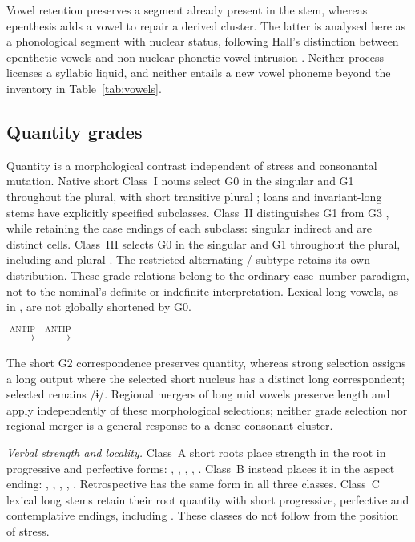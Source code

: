 Vowel retention preserves a segment already present in the stem, whereas
epenthesis adds a vowel to repair a derived cluster. The latter is analysed
here as a phonological segment with nuclear status, following Hall's distinction
between epenthetic vowels and non-nuclear phonetic vowel intrusion
\cite[pp.~387--388]{hall2006}. Neither process licenses a syllabic
liquid, and neither entails a new vowel phoneme beyond the inventory in
Table~\ref{tab:vowels}.

\subsection{Quantity grades}\label{sec:comp-lengthening}

Quantity is a morphological contrast independent of stress and consonantal
mutation. Native short Class~I nouns select G0 in the singular and G1 throughout
the plural, with short transitive plural ; loans and invariant-long
stems have explicitly specified subclasses. Class~II distinguishes G1
 from G3 , while retaining the case endings of each
subclass: singular indirect  and  are distinct cells.
Class~III  selects G0 in the singular and G1 throughout the plural,
including  and plural . The restricted alternating
/ subtype retains its own distribution.
These grade relations belong to the ordinary case--number paradigm, not to
the nominal's definite or indefinite interpretation. Lexical long vowels,
as in , are not globally shortened by G0.

\pex
\a {} $\xrightarrow{\mathrm{ANTIP}}$  
\a {} $\xrightarrow{\mathrm{ANTIP}}$  
\xe

The short G2 correspondence preserves quantity, whereas strong selection
assigns a long output where the selected short nucleus has a distinct
long correspondent; selected  remains /ɨ/. Regional mergers
of long mid vowels preserve length and apply independently of
these morphological selections; neither grade selection nor regional merger is a
general response to a dense consonant cluster.

\noindent\textit{Verbal strength and locality.}\quad
Class~A short roots place strength in the root in progressive and perfective
forms: , , , ,
. Class~B  instead places it in the aspect ending:
, , , ,
. Retrospective  has the same form in all
three classes. Class~C lexical long stems retain their root quantity with
short progressive, perfective and contemplative endings, including . These classes do
not follow from the position of stress.

